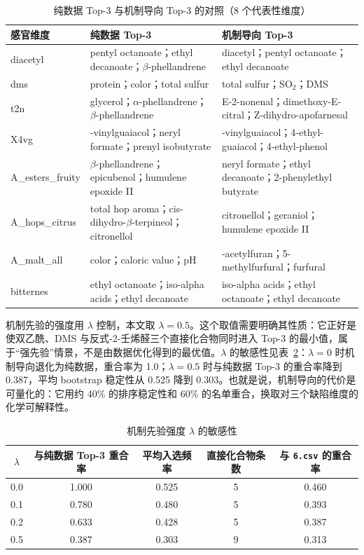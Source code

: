﻿\documentclass[UTF8,a4paper,zihao=-4]{ctexart}
\numberwithin{figure}{section}
\numberwithin{table}{section}
\numberwithin{equation}{section}
\newcommand{\file}[1]{\texttt{#1}}
\begin{document}
\begin{table}[H]
  \centering
  \caption{纯数据 Top-3 与机制导向 Top-3 的对照（8 个代表性维度）}
  \label{tab:q2-top3}
  \small
  \begin{tabularx}{\textwidth}{@{}l >{\hsize=1.05\hsize\raggedright\arraybackslash}X >{\hsize=0.95\hsize\raggedright\arraybackslash}X@{}}
    \toprule
    感官维度 & 纯数据 Top-3 & 机制导向 Top-3 \\
    \midrule
    diacetyl & pentyl octanoate；ethyl decanoate；$\beta$-phellandrene & diacetyl；pentyl octanoate；ethyl decanoate \\
    dms & protein；color；total sulfur & total sulfur；SO$_2$；DMS \\
    t2n & glycerol；$\alpha$-phellandrene；$\beta$-phellandrene & E-2-nonenal；dimethoxy-E-citral；Z-dihydro-apofarnesal \\
    X4vg & 4-vinylguaiacol；neryl formate；prenyl isobutyrate & 4-vinylguaiacol；4-ethyl-guaiacol；4-ethyl-phenol \\
    A\_esters\_fruity & $\beta$-phellandrene；epicubenol；humulene epoxide II & neryl formate；ethyl decanoate；2-phenylethyl butyrate \\
    A\_hops\_citrus & total hop aroma；cis-dihydro-$\beta$-terpineol；citronellol & citronellol；geraniol；humulene epoxide II \\
    A\_malt\_all & color；caloric value；pH & 2-acetylfuran；5-methylfurfural；furfural \\
    bitternes & ethyl octanoate；iso-alpha acids；ethyl decanoate & iso-alpha acids；ethyl octanoate；ethyl decanoate \\
    \bottomrule
  \end{tabularx}
\end{table}

机制先验的强度用 $\lambda$ 控制，本文取 $\lambda=0.5$。这个取值需要明确其性质：它正好是使双乙酰、DMS 与反式-2-壬烯醛三个直接化合物同时进入 Top-3 的最小值，属于“强先验”情景，不是由数据优化得到的最优值。$\lambda$ 的敏感性见表~\ref{tab:q2-lambda}：$\lambda=0$ 时机制导向退化为纯数据，重合率为 1.0；$\lambda=0.5$ 时与纯数据 Top-3 的重合率降到 0.387，平均 bootstrap 稳定性从 0.525 降到 0.303。也就是说，机制导向的代价是可量化的：它用约 40\% 的排序稳定性和 60\% 的名单重合，换取对三个缺陷维度的化学可解释性。

\begin{table}[H]
  \centering
  \caption{机制先验强度 $\lambda$ 的敏感性}
  \label{tab:q2-lambda}
  \small
  \begin{tabular*}{\textwidth}{@{\extracolsep{\fill}}c c c c c@{}}
    \toprule
    $\lambda$ & 与纯数据 Top-3 重合率 & 平均入选频率 & 直接化合物条数 & 与 \file{6.csv} 的重合率 \\
    \midrule
    0.0 & 1.000 & 0.525 & 5 & 0.460 \\
    0.1 & 0.780 & 0.480 & 5 & 0.393 \\
    0.2 & 0.633 & 0.428 & 5 & 0.387 \\
    0.5 & 0.387 & 0.303 & 9 & 0.313 \\
    \bottomrule
  \end{tabular*}
\end{table}
\end{document}
